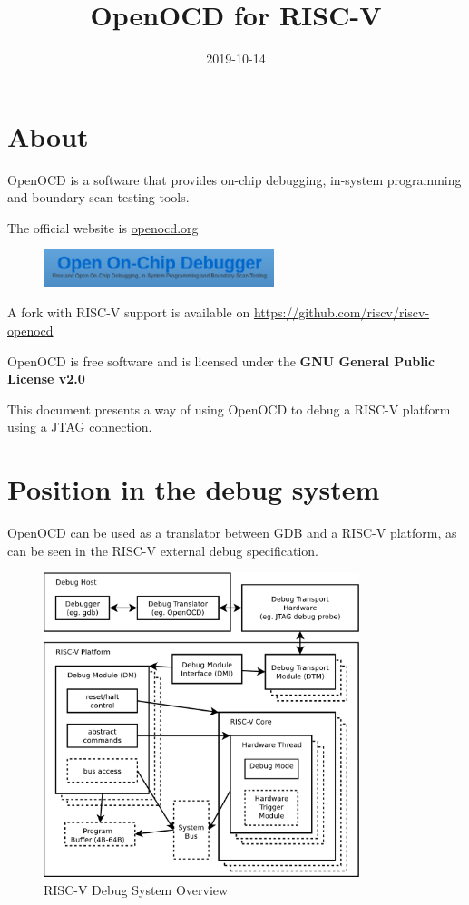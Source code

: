 \documentclass{article}
\title{OpenOCD for RISC-V}
\date{2019-10-14}
\begin{document}
	\maketitle
	
	\section{About}
	
	OpenOCD is a software that provides on-chip debugging, in-system programming and boundary-scan testing tools.
	
	The official website is \url{openocd.org}
	
	\begin{figure}[H]
	\centering
	\includegraphics[width=0.6\textwidth]{openocd.png}
	\end{figure}
	
	A fork with RISC-V support is available on \url{https://github.com/riscv/riscv-openocd}
	
	OpenOCD is free software and is licensed under the \textbf{GNU General Public License v2.0}
	
	This document presents a way of using OpenOCD to debug a RISC-V platform using a JTAG connection.
	
	
	\newpage
	\section{Position in the debug system}
	
	OpenOCD can be used as a translator between GDB and a RISC-V platform, as can be seen in the RISC-V external debug specification.
	
	\begin{figure}[H]
   	\centering
   	\includegraphics[width=0.82\textwidth]{overview.pdf}
   	\caption{RISC-V Debug System Overview}
   	\label{fig:overview}
	\end{figure}
	
\end{document}
